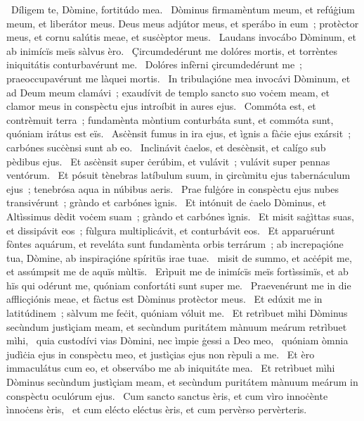 ~Díligem te, Dòmine, fortitúdo mea. 
~Dòminus firmamèntum meum, et refúġium meum, et liberátor meus. Deus meus adjútor meus, et sperábo in eum~; protèctor meus, et cornu salútis meae, et susċèptor meus. 
~Laudans invocábo Dòminum, et ab inimícïs meïs sàlvus èro. 
~Çircumdedérunt me dolóres mortis, et torrèntes iniquitátis conturbavérunt me. 
~Dolóres infèrni çircumdedérunt me~; praeoccupavérunt me làquei mortis. 
~In tribulaçióne mea invocávi Dòminum, et ad Deum meum clamávi~; exaudívit de templo sancto suo voċem meam, et clamor meus in conspèctu ejus introíbit in aures ejus. 
~Commóta est, et contrèmuit terra~; fundamènta mòntium conturbáta sunt, et commóta sunt, quóniam irátus est eïs. 
~Asċènsit fumus in ira ejus, et ìgnis a fàċie ejus exársit~; carbónes sucċènsi sunt ab eo. 
~Inclinávit ċaelos, et desċènsit, et calígo sub pèdibus ejus. 
~Et asċènsit super ċerúbim, et vulávit~; vulávit super pennas ventórum. 
~Et pósuit tènebras latíbulum suum, in çircùmitu ejus tabernáculum ejus~; tenebrósa aqua in núbibus aeris. 
~Prae fulġóre in conspèctu ejus nubes transivérunt~; gràndo et carbónes ìgnis. 
~Et intónuit de ċaelo Dòminus, et Altìssimus dèdit voċem suam~; gràndo et carbónes ìgnis. 
~Et misit saġìttas suas, et dissipávit eos~; fùlgura multiplicávit, et conturbávit eos. 
~Et apparuérunt fòntes aquárum, et reveláta sunt fundamènta orbis terrárum~; ab increpaçióne tua, Dòmine, ab inspiraçióne spíritüs irae tuae. 
~misit de summo, et acċépit me, et assúmpsit me de aquïs mùltïs. 
~Erìpuit me de inimícïs meïs fortìssimïs, et ab hïs qui odérunt me, quóniam confortáti sunt super me. 
~Praevenérunt me in die afflicçiónis meae, et fàctus est Dòminus protèctor meus. 
~Et edúxit me in latitúdinem~; sàlvum me feċit, quóniam vóluit me. 
~Et retrìbuet mìhi Dòminus secùndum justìçiam meam, et secùndum puritátem mànuum meárum retrìbuet mìhi, 
~quia custodívi vias Dòmini, nec ìmpie ġessi a Deo meo, 
~quóniam òmnia judìċia ejus in conspèctu meo, et justìçias ejus non rèpuli a me. 
~Et èro immaculátus cum eo, et observábo me ab iniquitáte mea. 
~Et retrìbuet mìhi Dòminus secùndum justìçiam meam, et secùndum puritátem mànuum meárum in conspèctu oculórum ejus. 
~Cum sancto sanctus èris, et cum vìro innoċènte ìnnoċens èris, 
~et cum elécto eléctus èris, et cum pervèrso pervèrteris. 
